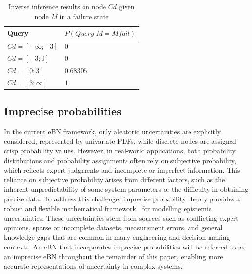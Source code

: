 \begin{table}[hbt!]
    \begin{center}
        \caption{Inverse inference results on node $Cd$ given node \textit{M} in a failure state}\label{inverse_inference_tab}
        \begin{tabular}{P{3cm}P{4cm}}
            \textbf{Query} & \textbf{$P(Query | M = M fail)$} \\
            \midrule
            $Cd = [-\infty;-3]$ & $0$ \\
            $Cd = [-3;0]$ & $0$ \\
            $Cd = [0;3]$ & $0.68305$ \\
            $Cd = [3;\infty]$ & $1$ \\
        \end{tabular}
    \end{center}
\end{table}

\subsection{Imprecise probabilities}
In the current eBN framework, only aleatoric uncertainties are explicitly considered, represented by univariate PDFs, while discrete nodes are assigned crisp probability values. 
However, in real-world applications, both probability distributions and probability assignments often rely on subjective probability, which reflects expert judgments and incomplete or imperfect information. 
This reliance on subjective probability arises from different factors, such as the inherent unpredictability of some system parameters or the difficulty in obtaining precise data. 
To address this challenge, imprecise probability theory provides a robust and flexible mathematical framework~\cite{beer_imprecise_2013-1} for modelling epistemic uncertainties. 
These uncertainties stem from sources such as conflicting expert opinions, sparse or incomplete datasets, measurement errors, and general knowledge gaps that are common in many engineering and decision-making contexts. 
An eBN that incorporates imprecise probabilities will be referred to as an imprecise eBN throughout the remainder of this paper, enabling more accurate representations of uncertainty in complex systems.


